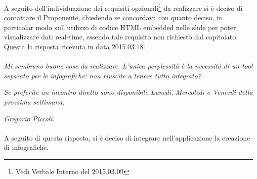 A seguito dell'individuazione dei requisiti opzionali\footnote{Vedi Verbale Interno del 2015.03.09} da realizzare si è deciso di contattare il Proponente, chiedendo se concordava con quanto deciso, in particolar modo sull'utilizzo di codice HTML embedded nelle slide per poter visualizzare dati real-time, essendo tale requisito non richiesto dal capitolato. Questa la risposta ricevuta in data 2015.03.18:

\paragraph{}
\textit{Mi sembrano buone cose da realizzare. L'unica perplessità è la necessità di un tool separato per le infografiche: non riuscite a tenere tutto integrato?} 
	
\noindent \textit{Se preferite un incontro diretto sono disponibile Lunedì, Mercoledì o Venerdì della prossima settimana.}

\noindent \textit{Gregorio Piccoli.}

\paragraph{}
\noindent A seguito di questa risposta, si è deciso di integrare nell'applicazione la creazione di infografiche.